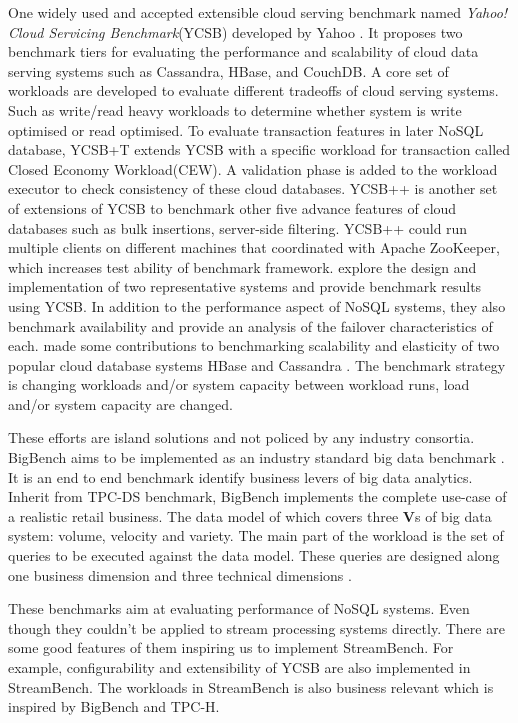 One widely used and accepted extensible cloud serving benchmark named \textit{Yahoo! Cloud Servicing Benchmark}(YCSB) developed by Yahoo \cite{YCSB}. It proposes two benchmark tiers for evaluating the performance and scalability of cloud data serving systems such as Cassandra, HBase, and CouchDB. A core set of workloads are developed to evaluate different tradeoffs of cloud serving systems. Such as write/read heavy workloads to determine whether system is write optimised or read optimised. To evaluate transaction features in later NoSQL database, YCSB+T \cite{dey2014ycsb+t} extends YCSB with a specific workload for transaction called Closed Economy Workload(CEW). A validation phase is added to the workload executor to check consistency of these cloud databases. YCSB++ \cite{ycsb++} is another set of extensions of YCSB to benchmark other five advance features of cloud databases such as bulk insertions, server-side filtering. YCSB++ could run multiple clients on different machines that coordinated with Apache ZooKeeper, which increases test ability of benchmark framework. \citet{pokludabenchmarking}  explore the design and implementation of two representative systems and provide benchmark results using YCSB. In addition to the performance aspect of NoSQL systems, they also benchmark availability and provide an analysis of the failover characteristics of each. \citeauthor{Kuhlenkamp} made some contributions to benchmarking scalability and elasticity of two popular cloud database systems HBase and Cassandra \cite{Kuhlenkamp}. The benchmark strategy is changing workloads and/or system capacity between workload runs, load and/or system capacity are changed.

These efforts are island solutions and not policed by any industry consortia. BigBench aims to be implemented as an industry standard big data benchmark \cite{BigBench}. It is an end to end benchmark identify business levers of big data analytics. Inherit from TPC-DS benchmark, BigBench implements the complete use-case of a realistic retail business. The data model of which covers three \textbf{V}s of big data system: volume, velocity and variety. The main part of the workload is the set of queries to be executed against the data model. These queries are designed along one business dimension and three technical dimensions \cite{BigBench}.

These benchmarks aim at evaluating performance of NoSQL systems. Even though they couldn't be applied to stream processing systems directly. There are some good features of them inspiring us to implement StreamBench. For example, configurability and extensibility of YCSB are also implemented in StreamBench. The workloads in StreamBench is also business relevant which is inspired by BigBench and TPC-H.

